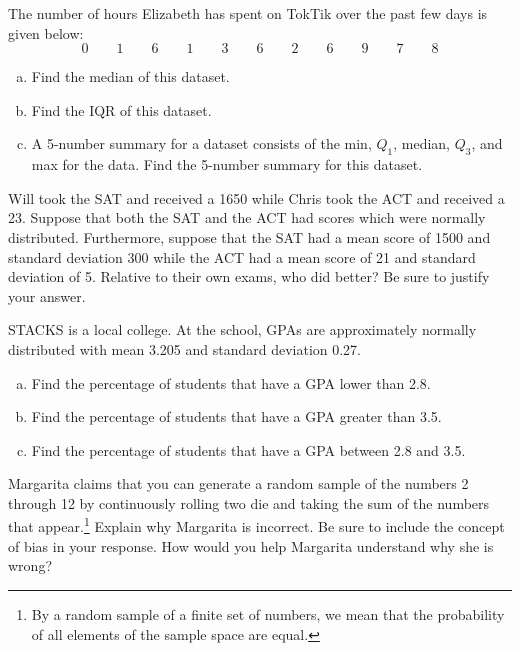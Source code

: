 \documentclass[11pt,letterpaper]{article}
\begin{document}

 The number of hours Elizabeth has spent on TokTik over the past few days is given below:
	\[
	0 \qquad 1 \qquad 6 \qquad 1 \qquad 3 \qquad 6 \qquad 2 \qquad 6 \qquad 9 \qquad 7 \qquad 8  
	\] 

\begin{enumerate}[(a)]
\item Find the median of this dataset.
\item Find the IQR of this dataset. 
\item A 5-number summary for a dataset consists of the min, $Q_1$, median, $Q_3$, and max for the data. Find the 5-number summary for this dataset. 
\end{enumerate}



\newpage



 Will took the SAT and received a 1650 while Chris took the ACT and received a 23. Suppose that both the SAT and the ACT had scores which were normally distributed. Furthermore, suppose that the SAT had a mean score of 1500 and standard deviation 300 while the ACT had a mean score of 21 and standard deviation of 5. Relative to their own exams, who did better? Be sure to justify your answer. \pspace



\newpage



 STACKS is a local college. At the school, GPAs are approximately normally distributed with mean 3.205 and standard deviation 0.27. 
	\begin{enumerate}[(a)]
	\item Find the percentage of students that have a GPA lower than 2.8.
	\item Find the percentage of students that have a GPA greater than 3.5. 
	\item Find the percentage of students that have a GPA between 2.8 and 3.5. 
	\end{enumerate}



\newpage



 Margarita claims that you can generate a random sample of the numbers 2 through 12 by continuously rolling two die and taking the sum of the numbers that appear.\footnote{By a random sample of a finite set of numbers, we mean that the probability of all elements of the sample space are equal.} Explain why Margarita is incorrect. Be sure to include the concept of bias in your response. How would you help Margarita understand why she is wrong? \pspace
\end{document}
